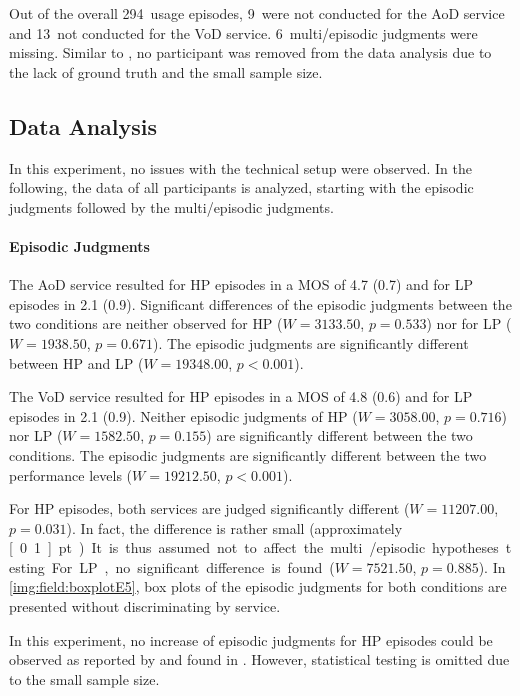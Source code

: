 Out of the overall 294~usage episodes, 9~were not conducted for the \ac{AoD} service and 13~not conducted for the \ac{VoD} service.
6~multi\-/episodic judgments were missing.
Similar to , no participant was removed from the data analysis due to the lack of ground truth and the small sample size.

\subsection{Data Analysis}
In this experiment, no issues with the technical setup were observed.
In the following, the data of all participants is analyzed, starting with the episodic judgments followed by the multi\-/episodic judgments.

\paragraph*{Episodic Judgments}
The \ac{AoD} service resulted for \ac{HP} episodes in a \ac{MOS} of 4.7 (0.7) and for \ac{LP} episodes in 2.1 (0.9).
Significant differences of the episodic judgments between the two conditions are neither observed for \ac{HP} ($W=3133.50$, $p=0.533$) nor for \ac{LP} ($W=1938.50$, $p=0.671$).
The episodic judgments are significantly different between \ac{HP} and \ac{LP} ($W=19348.00$, $p<0.001$).

The \ac{VoD} service resulted for \ac{HP} episodes in a \ac{MOS} of 4.8 (0.6) and for \ac{LP} episodes in 2.1 (0.9).
Neither episodic judgments of \ac{HP} ($W=3058.00$, $p=0.716$) nor \ac{LP} ($W=1582.50$, $p=0.155$) are significantly different between the two conditions.
The episodic judgments are significantly different between the two performance levels ($W=19212.50$, $p<0.001$).

For \ac{HP} episodes, both services are judged significantly different ($W=11207.00$, $p=0.031$).
In fact, the difference is rather small (approximately \unit[0.1]{pt}).
It is thus assumed not to affect the multi\-/episodic hypotheses testing.
For \ac{LP}, no significant difference is found ($W=7521.50$, $p=0.885$).
In \autoref{img:field:boxplotE5}, box plots of the episodic judgments for both conditions are presented without discriminating by service.

In this experiment, no increase of episodic judgments for \ac{HP} episodes could be observed as reported by \citet{moller_single-call_2011} and found in .
However, statistical testing is omitted due to the small sample size.

